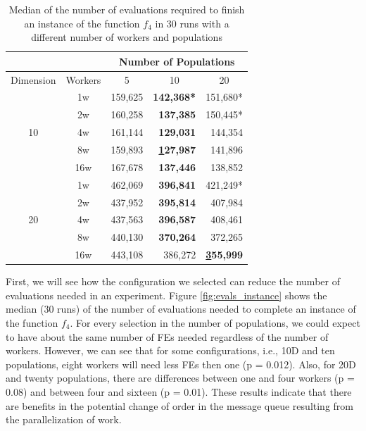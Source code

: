 \documentclass[review]{elsarticle}
\begin{document}
\begin{table}[tbp]
  \caption{Median of the number of evaluations required to finish an instance of the function $f_4$ in 30 runs
    with a different number of workers and populations}
  \label{tab:evals_instance}
  \vspace{0.25cm}
  \centering

  \begin{tabular}{|c|c|r|r|r|}
  \hline
  \multicolumn{1}{|c}{} &   \multicolumn{1}{c}{}  & \multicolumn{3}{|c|}{Number of Populations} \\
  \hline
  Dimension           & Workers & \multicolumn{1}{c|}{5}       & \multicolumn{1}{c|}{10}      & \multicolumn{1}{c|}{20}          \\
  \hline
  \multirow{5}{*}{10} & 1w      & 159,625      & \textbf{142,368*}      & 151,680*     \\
                      & 2w      & 160,258      & \textbf{137,385}      & 150,445*     \\
                      & 4w      & 161,144      & \textbf{129,031}      & 144,354     \\
                      & 8w      & 159,893      & \textbf{{\ul 127,987}}      & 141,896     \\
                      & 16w     & 167,678      & \textbf{137,446}      & 138,852     \\
                      \hline
  \multirow{5}{*}{20} & 1w      & 462,069      & \textbf{396,841}      & 421,249*     \\
                      & 2w      & 437,952      & \textbf{395,814}      & 407,984     \\
                      & 4w      & 437,563      & \textbf{396,587}      & 408,461     \\
                      & 8w      & 440,130      & \textbf{370,264}      & 372,265     \\
                      & 16w     & 443,108      &         386,272       & \textbf{{\ul 355,999}}\\
                      \hline  
  \end{tabular}
  \end{table}


First, we will see how the configuration we selected can reduce the number of
evaluations needed in an experiment. Figure \ref{fig:evals_instance} shows the
median (30 runs) of the number of evaluations needed to complete an instance of
the function $f_4$. For every selection in the number of populations, we could
expect to have about the same number of FEs needed regardless of the number of
workers. However, we can see that for some configurations, i.e., 10D and ten
populations, eight workers will need less FEs then one (p = 0.012). Also, for
20D and twenty populations, there are differences between one and four workers
(p = 0.08) and between four and sixteen (p = 0.01). These results indicate that
there are benefits in the potential change of order in the message queue
resulting from the parallelization of work.
\end{document}
